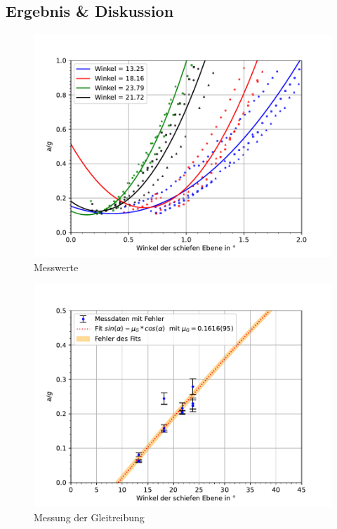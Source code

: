 \documentclass[11pt, a4paper]{article}
\begin{document}
    \subsection{Ergebnis \& Diskussion}
    \begin{figure}[H]
        \centering
        \includegraphics[width=\textwidth]{./multiple.pdf}

        \caption{Messwerte}
        \label{fig:mult}
    \end{figure}
    \begin{figure}[H]
        \centering
        \includegraphics[width=\textwidth]{./7Plotgleit.pdf}

        \caption{Messung der Gleitreibung}
        \label{fig:Gleitr}
    \end{figure}
\end{document}
